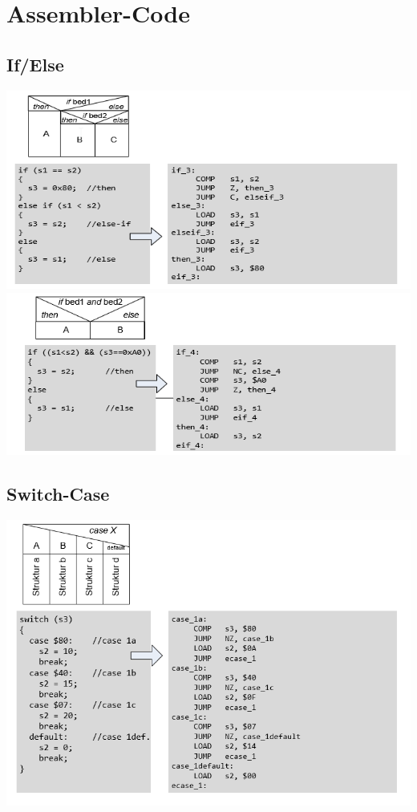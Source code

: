 \section{Assembler-Code}
\subsection{If/Else}
\includegraphics[width=\linewidth]{Images/ifelseif}
\includegraphics[width=\linewidth]{Images/ifelseif_multiple}


\subsection{Switch-Case}
\includegraphics[width=\linewidth]{Images/switchcase}

